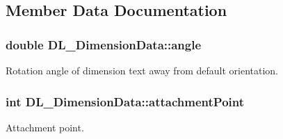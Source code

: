 \subsection{Member Data Documentation}
\hypertarget{structDL__DimensionData_afd8dffdf019754353a13ca80bf77efb9}{
\subsubsection[{angle}]{\setlength{\rightskip}{0pt plus 5cm}double D\-L\-\_\-\-Dimension\-Data\-::angle}}\label{structDL__DimensionData_afd8dffdf019754353a13ca80bf77efb9}
Rotation angle of dimension text away from default orientation. \hypertarget{structDL__DimensionData_a0dab1cab77a156a4eb52327012ea1239}{
\subsubsection[{attachment\-Point}]{\setlength{\rightskip}{0pt plus 5cm}int D\-L\-\_\-\-Dimension\-Data\-::attachment\-Point}}\label{structDL__DimensionData_a0dab1cab77a156a4eb52327012ea1239}
Attachment point.

